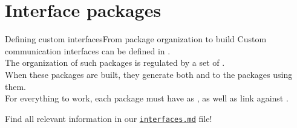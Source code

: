 
\section{Interface packages}

\begin{frame}{Defining custom interfaces}{From package organization to build}
  Custom communication interfaces can be defined in .\\
  \bigskip
  The organization of such packages is regulated by a set of .\\
  \bigskip
  When these packages are built, they generate both  and  to the packages using them.\\
  \bigskip
  For everything to work, each package must have  as , as well as link against .\\
  \bigskip
  \begin{block}{}
    \centering
    Find all relevant information in our \href{https://github.com/IntelligentSystemsLabUTV/ros2-examples/blob/humble/interfaces.md}{\color{blue}\underline{\texttt{interfaces.md}}} file!
  \end{block}
\end{frame}
